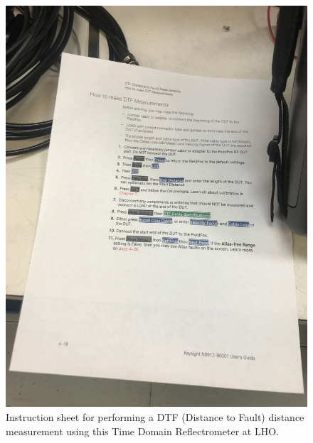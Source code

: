 \documentclass{article}
\begin{document}
\begin{figure}[!htb]
	\begin{center}
		\includegraphics[width=0.8\linewidth]{img/time-domain-reflectrometer-dtf-instructions.jpg}
	\end{center}
	\caption{Instruction sheet for performing a DTF (Distance to Fault) distance measurement using this Time Domain Reflectrometer at LHO.}
	\label{fig:tdr-dtf-instructions}
\end{figure}
\end{document}
